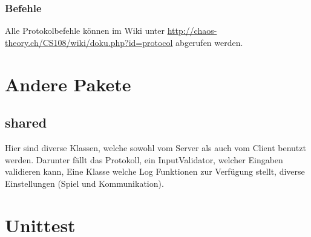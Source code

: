\documentclass[ngerman, 12pt, pdftex]{scrartcl}[2006/07/30]
\begin{document}
\subsubsection{Befehle}
Alle Protokolbefehle können im Wiki unter \url{http://chaos-theory.ch/CS108/wiki/doku.php?id=protocol} abgerufen werden.

\section{Andere Pakete}
\subsection{shared}
Hier sind diverse Klassen, welche sowohl vom Server als auch vom Client benutzt werden.
Darunter fällt das Protokoll, ein InputValidator, welcher Eingaben validieren kann, Eine Klasse welche Log Funktionen zur Verfügung stellt,
diverse Einstellungen (Spiel und Kommunikation).

\section{Unittest}

\end{document}

